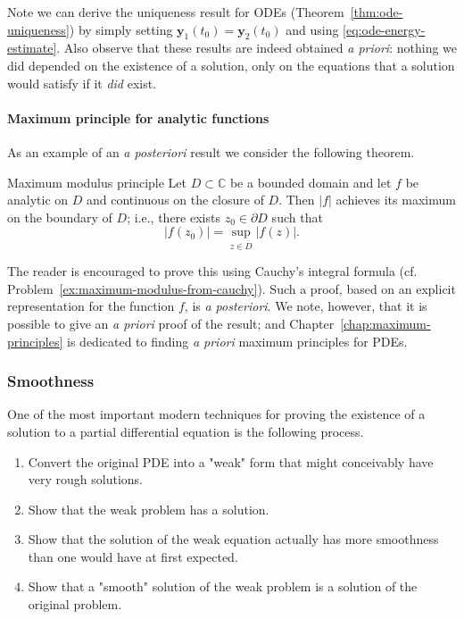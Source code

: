 Note we can derive the uniqueness result for ODEs (Theorem~\ref{thm:ode-uniqueness}) by simply setting $\bm{y}_1(t_0)=\bm{y}_2(t_0)$ and using \eqref{eq:ode-energy-estimate}. Also observe that these results are indeed obtained \emph{a priori}: nothing we did depended on the existence of a solution, only on the equations that a solution would satisfy if it \emph{did} exist.

\paragraph*{Maximum principle for analytic functions}

As an example of an \emph{a posteriori} result we consider the following theorem.

\begin{Theorem}{Maximum modulus principle}
\label{thm:maximum-modulus}
Let $D\subset\mathbb{C}$ be a bounded domain and let $f$ be analytic on $D$ and continuous on the closure of $D$. Then $|f|$ achieves its maximum on the boundary of $D$; i.e., there exists $z_0\in\partial D$ such that
\begin{equation}\label{eq:analytic-maximum-modulus}
|f(z_0)|=\sup_{z\in\overline{D}}|f(z)|.
\end{equation}

\end{Theorem}

The reader is encouraged to prove this using Cauchy's integral formula (cf. Problem~\ref{ex:maximum-modulus-from-cauchy}). Such a proof, based on an explicit representation for the function $f$, is \emph{a posteriori}. We note, however, that it is possible to give an \emph{a priori} proof of the result; and Chapter~\ref{chap:maximum-principles} is dedicated to finding \emph{a priori} maximum principles for PDEs.

\subsubsection{Smoothness}\label{subsec:smoothness}

One of the most important modern techniques for proving the existence of a solution to a partial differential equation is the following process.
\begin{enumerate}
\item Convert the original PDE into a "weak" form that might conceivably have very rough solutions.
\item Show that the weak problem has a solution.
\item Show that the solution of the weak equation actually has more smoothness than one would have at first expected.
\item Show that a "smooth" solution of the weak problem is a solution of the original problem.
\end{enumerate}

